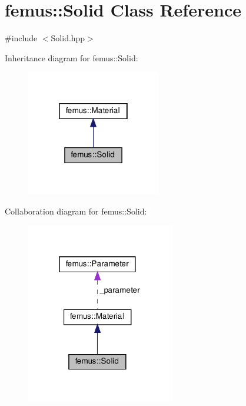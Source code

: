 \hypertarget{classfemus_1_1_solid}{}\section{femus\+:\+:Solid Class Reference}
\label{classfemus_1_1_solid}


{\ttfamily \#include $<$Solid.\+hpp$>$}



Inheritance diagram for femus\+:\+:Solid\+:
\nopagebreak
\begin{figure}[H]
\begin{center}
\leavevmode
\includegraphics[width=166pt]{classfemus_1_1_solid__inherit__graph}
\end{center}
\end{figure}


Collaboration diagram for femus\+:\+:Solid\+:
\nopagebreak
\begin{figure}[H]
\begin{center}
\leavevmode
\includegraphics[width=184pt]{classfemus_1_1_solid__coll__graph}
\end{center}
\end{figure}
